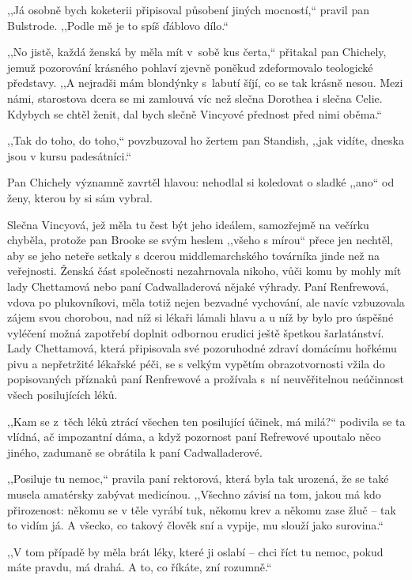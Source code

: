 ,,Já osobně bych koketerii připisoval působení jiných mocností,`` pravil pan Bulstrode. ,,Podle mě je to spíš ďáblovo dílo.``     
     
,,No jistě, každá ženská by měla mít v sobě kus čerta,`` přitakal pan Chichely, jemuž pozorování krásného pohlaví zjevně poněkud zdeformovalo teologické představy. ,,A nejradši mám blondýnky s labutí šíjí, co se tak krásně nesou. Mezi námi, starostova dcera se mi zamlouvá víc než slečna Dorothea i slečna Celie. Kdybych se chtěl ženit, dal bych slečně Vincyové přednost před nimi oběma.``

,,Tak do toho, do toho,`` povzbuzoval ho žertem pan Standish, ,,jak vidíte, dneska jsou v kursu padesátníci.``

Pan Chichely významně zavrtěl hlavou: nehodlal si koledovat o sladké ,,ano`` od ženy, kterou by si sám vybral. 

Slečna Vincyová, jež měla tu čest být jeho ideálem, samozřejmě na večírku chyběla, protože pan Brooke se svým heslem ,,všeho s mírou`` přece jen nechtěl, aby se jeho neteře setkaly s dcerou middlemarchského továrníka jinde než na veřejnosti. Ženská část společnosti nezahrnovala nikoho, vůči komu by mohly mít lady Chettamová nebo paní Cadwalladerová nějaké výhrady. Paní Renfrewová, vdova po plukovníkovi, měla totiž nejen bezvadné vychování, ale navíc vzbuzovala zájem svou chorobou, nad níž si lékaři lámali hlavu a u níž by bylo pro úspěšné vyléčení možná zapotřebí doplnit odbornou erudici ještě špetkou šarlatánství. Lady Chettamová, která připisovala své pozoruhodné zdraví domácímu hořkému pivu a nepřetržité lékařské péči, se s velkým vypětím obrazotvornosti vžila do popisovaných příznaků paní Renfrewové a prožívala s ní neuvěřitelnou neúčinnost všech posilujících léků.            

,,Kam se z těch léků ztrácí všechen ten posilující účinek, má milá?`` podivila se ta vlídná, ač impozantní dáma, a když pozornost paní Refrewové upoutalo něco jiného, zadumaně se obrátila k paní Cadwalladerové. 

,,Posiluje tu nemoc,`` pravila paní rektorová, která byla tak urozená, že se také musela amatérsky zabývat medicínou. ,,Všechno závisí na tom, jakou má kdo přirozenost: někomu se v těle vyrábí tuk, někomu krev a někomu zase žluč -- tak to vidím já. A všecko, co takový člověk sní a vypije, mu slouží jako surovina.``   

,,V tom případě by měla brát léky, které ji oslabí -- chci říct tu nemoc, pokud máte pravdu, má drahá. A to, co říkáte, zní rozumně.``

